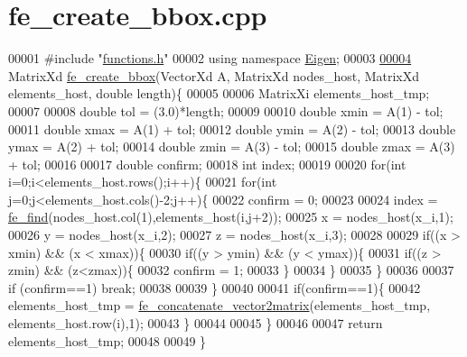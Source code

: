 \hypertarget{fe__create__bbox_8cpp_source}{}\section{fe\+\_\+create\+\_\+bbox.\+cpp}
\label{fe__create__bbox_8cpp_source}

\begin{DoxyCode}
00001 \textcolor{preprocessor}{#include "\hyperlink{functions_8h}{functions.h}"}
00002 \textcolor{keyword}{using namespace }\hyperlink{namespace_eigen}{Eigen};
00003 
\hyperlink{fe__create__bbox_8cpp_a150d77644eb280d58564e3ff4885e73c}{00004} MatrixXd \hyperlink{fe__create__bbox_8cpp_a150d77644eb280d58564e3ff4885e73c}{fe\_create\_bbox}(VectorXd A, MatrixXd nodes\_host, MatrixXd elements\_host, \textcolor{keywordtype}{double} 
      length)\{
00005 
00006     MatrixXi elements\_host\_tmp;
00007     
00008     \textcolor{keywordtype}{double} tol = (3.0)*length;
00009 
00010     \textcolor{keywordtype}{double} xmin = A(1) - tol;
00011     \textcolor{keywordtype}{double} xmax = A(1) + tol;
00012     \textcolor{keywordtype}{double} ymin = A(2) - tol;
00013     \textcolor{keywordtype}{double} ymax = A(2) + tol;
00014     \textcolor{keywordtype}{double} zmin = A(3) - tol;
00015     \textcolor{keywordtype}{double} zmax = A(3) + tol;
00016 
00017     \textcolor{keywordtype}{double} confirm;
00018     \textcolor{keywordtype}{int} index;
00019 
00020     \textcolor{keywordflow}{for}(\textcolor{keywordtype}{int} i=0;i<elements\_host.rows();i++)\{
00021         \textcolor{keywordflow}{for}(\textcolor{keywordtype}{int} j=0;j<elements\_host.cols()-2;j++)\{
00022             confirm = 0;
00023 
00024             index = \hyperlink{functions_8h_a983304137f9a961469a558437d5d2d59}{fe\_find}(nodes\_host.col(1),elements\_host(i,j+2));
00025             x = nodes\_host(x\_i,1);
00026             y = nodes\_host(x\_i,2);
00027             z = nodes\_host(x\_i,3);
00028 
00029             \textcolor{keywordflow}{if}((x > xmin) && (x < xmax))\{
00030                 \textcolor{keywordflow}{if}((y > ymin) && (y < ymax))\{
00031                     \textcolor{keywordflow}{if}((z > zmin) && (z<zmax))\{
00032                         confirm = 1;
00033                     \}
00034                 \}
00035             \}
00036 
00037             \textcolor{keywordflow}{if} (confirm==1) \textcolor{keywordflow}{break};
00038 
00039         \}
00040 
00041         \textcolor{keywordflow}{if}(confirm==1)\{
00042             elements\_host\_tmp = \hyperlink{functions_8h_ac2d90cb6719488bc8551e6f9437f4f76}{fe\_concatenate\_vector2matrix}(elements\_host\_tmp,
      elements\_host.row(i),1);
00043         \}
00044 
00045     \}
00046 
00047     \textcolor{keywordflow}{return} elements\_host\_tmp;
00048 
00049 \}
\end{DoxyCode}
